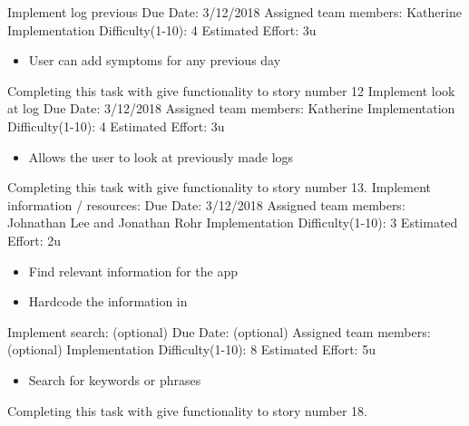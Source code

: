 \documentclass[letterpaper,12pt,titlepage]{article}
\begin{document}
\newline
Implement log previous
\newline
Due Date: 3/12/2018
\newline
Assigned team members: Katherine
\newline
Implementation Difficulty(1-10): 4
\newline
Estimated Effort: 3u
\begin{itemize}
\item User can add symptoms for any previous day
\end{itemize}
Completing this task with give functionality to story number 12
\newline
Implement look at log
\newline
Due Date: 3/12/2018
\newline
Assigned team members: Katherine
\newline
Implementation Difficulty(1-10): 4
\newline
Estimated Effort: 3u
\begin{itemize}
\item Allows the user to look at previously made logs
\end{itemize}
Completing this task with give functionality to story number 13.
\newline
\newline
Implement information / resources:
\newline
Due Date: 3/12/2018
\newline
Assigned team members: Johnathan Lee and Jonathan Rohr
\newline
Implementation Difficulty(1-10): 3
\newline
Estimated Effort: 2u
\begin{itemize}
\item Find relevant information for the app
\item Hardcode the information in
\end{itemize}
Implement search: 					(optional)
\newline
Due Date: (optional)
\newline
Assigned team members: (optional)
\newline
Implementation Difficulty(1-10): 8
\newline
Estimated Effort: 5u
\begin{itemize}
\item Search for keywords or phrases
\end{itemize}
Completing this task with give functionality to story number 18.
\end{document}
